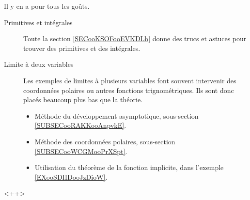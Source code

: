         \label{THEMEooLTCIooGDIPnF}

Il y en a pour tous les goûts.

\begin{description}
    \item[Primitives et intégrales]
        Toute la section \ref{SECooKSOFooEVKDLh} donne des trucs et astuces pour trouver des primitives et des intégrales.
    \item[Limite à deux variables]

        Les exemples de limites à plusieurs variables font souvent intervenir des coordonnées polaires ou autres fonctions trignométriques. Ils sont donc placés beaucoup plus bas que la théorie.
        \begin{itemize}
            \item Méthode du développement asymptotique, sous-section \ref{SUBSECooRAKKooAnpvkE}.
            \item Méthode des coordonnées polaires, sous-section \ref{SUBSECooWCGMooPrXSpt}.
            \item Utilisation du théorème de la fonction implicite, dans l'exemple \ref{EXooSDHDooJzDioW}.
        \end{itemize}

\end{description}
<++>

